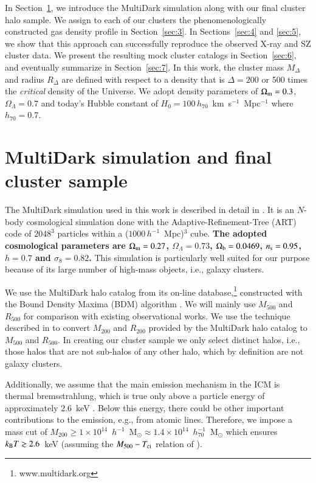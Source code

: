 \documentclass[useAMS,usenatbib]{mn2e}
\begin{document}
{  In Section~\ref{sec:2}, we introduce the MultiDark simulation along with our
  final cluster halo sample. We assign to each of our clusters the
  phenomenologically constructed gas density profile in Section~\ref{sec:3}. In
  Sections~\ref{sec:4} and \ref{sec:5}, we show that this approach can
  successfully reproduce the observed X-ray and SZ cluster data. We present the
  resulting mock cluster catalogs in Section~\ref{sec:6}, and eventually
  summarize in Section~\ref{sec:7}.  In this work, the cluster mass $M_{\Delta}$
  and radius $R_{\Delta}$ are defined with respect to a density that is
  $\Delta=200$ or 500 times the \emph{critical} density of the Universe. We
  adopt density parameters of $\Omega_{{\mathrm{m}}}=0.3$, $\Omega_{\Lambda}=0.7$ and
  today's Hubble constant of $H_0 = 100\, h_{70}$~km~s$^{-1}$~Mpc$^{-1}$ where
  $h_{70} = 0.7$.}




\section{MultiDark simulation and final cluster sample}
\label{sec:2}
The MultiDark simulation used in this work is described in detail in
\cite{2011arXiv1104.5130P}.  It is an $N$-body cosmological simulation done with
the Adaptive-Refinement-Tree (ART) code \citep{1997ApJS..111...73K} of $2048^3$
particles within a ($1000\,h^{-1}$~Mpc)$^3$ cube. {\bf The adopted cosmological
  parameters are $\Omega_{{\mathrm{m}}}=0.27$, $\Omega_{\Lambda}=0.73$,
  $\Omega_{\mathrm{b}}=0.0469$, $n_{\mathrm{s}}=0.95$, $h=0.7$ and $\sigma_8=0.82$.} This
simulation is particularly well suited for our purpose because of its large
number of high-mass objects, i.e., galaxy clusters.
 
We use the MultiDark halo catalog from its on-line database,\footnote{www.multidark.org} 
constructed with the Bound Density Maxima (BDM) algorithm \citep{1997astro.ph.12217K}.  
We will mainly use $M_{500}$ and $R_{500}$ for comparison with existing observational works.  
We use the technique described in \cite{2003ApJ...584..702H} to convert $M_{200}$ and
$R_{200}$ provided by the MultiDark halo catalog to $M_{500}$ and $R_{500}$.  In
creating our cluster sample we only select distinct halos, i.e., those halos that
are not sub-halos of any other halo, which by definition are not galaxy clusters.

Additionally, we assume that the main emission mechanism in the ICM is thermal
bremsstrahlung, which is true only above a particle energy of approximately
$2.6$~keV \citep{1988xrec.book.....S}. Below this
energy, there could be other important contributions to the emission,
e.g., from atomic lines. Therefore, we impose a mass cut of
$M_{200}\geq1\times10^{14}$~$h^{-1}$~M$_{\odot}\approx1.4\times10^{14}$~$h_{70}^{-1}$~M$_{\odot}$
which ensures $k_{{\mathrm{B}}}T \gtrsim 2.6$~keV (assuming the $M_{500} - T_{{\mathrm{ci}}}$ relation
of \citealt{2010MNRAS.406.1773M}).
\end{document}
